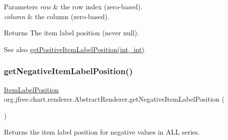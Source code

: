 \begin{DoxyParams}{Parameters}
{\em row} & the row index (zero-\/based). \\
\hline
{\em column} & the column (zero-\/based).\\
\hline
\end{DoxyParams}
\begin{DoxyReturn}{Returns}
The item label position (never {\ttfamily null}).
\end{DoxyReturn}
\begin{DoxySeeAlso}{See also}
\mbox{\hyperlink{classorg_1_1jfree_1_1chart_1_1renderer_1_1_abstract_renderer_a6737068cd9f275dae38acd6173a80708}{get\+Positive\+Item\+Label\+Position(int, int)}} 
\end{DoxySeeAlso}
\mbox{\label{classorg_1_1jfree_1_1chart_1_1renderer_1_1_abstract_renderer_a1342825ba4cb7d47141e73b83fc50903}} 
\subsubsection{\texorpdfstring{get\+Negative\+Item\+Label\+Position()}{getNegativeItemLabelPosition()}\hspace{0.1cm}{\footnotesize\ttfamily [2/2]}}
{\footnotesize\ttfamily \mbox{\hyperlink{classorg_1_1jfree_1_1chart_1_1labels_1_1_item_label_position}{Item\+Label\+Position}} org.\+jfree.\+chart.\+renderer.\+Abstract\+Renderer.\+get\+Negative\+Item\+Label\+Position (\begin{DoxyParamCaption}{ }\end{DoxyParamCaption})}

Returns the item label position for negative values in A\+LL series.

